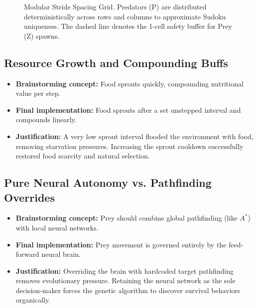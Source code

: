 \documentclass[11pt,a4paper]{article}
\begin{document}
\begin{figure}[ht]
\centering
{}
\caption{Modular Stride Spacing Grid. Predators (P) are distributed deterministically across rows and columns to approximate Sudoku uniqueness. The dashed line denotes the 1-cell safety buffer for Prey (Z) spawns.}
\label{fig:sudoku}
\end{figure}

\subsection{Resource Growth and Compounding Buffs}
\begin{itemize}
    \item \textbf{Brainstorming concept:} Food sprouts quickly, compounding nutritional value per step.
    \item \textbf{Final implementation:} Food sprouts after a set unstepped interval and compounds linearly.
    \item \textbf{Justification:} A very low sprout interval flooded the environment with food, removing starvation pressures. Increasing the sprout cooldown successfully restored food scarcity and natural selection.
\end{itemize}

\subsection{Pure Neural Autonomy vs. Pathfinding Overrides}
\begin{itemize}
    \item \textbf{Brainstorming concept:} Prey should combine global pathfinding (like $A^*$) with local neural networks.
    \item \textbf{Final implementation:} Prey movement is governed entirely by the feed-forward neural brain.
    \item \textbf{Justification:} Overriding the brain with hardcoded target pathfinding removes evolutionary pressure. Retaining the neural network as the sole decision-maker forces the genetic algorithm to discover survival behaviors organically.
\end{itemize}
\end{document}
